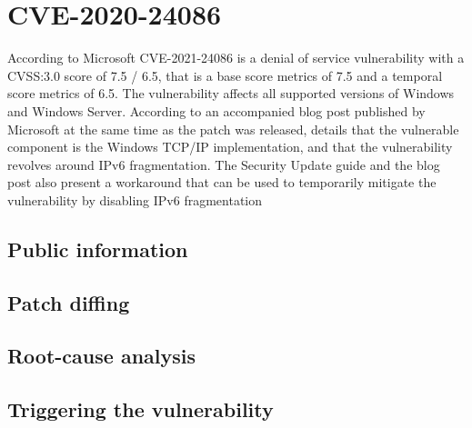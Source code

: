 \documentclass{report}
\begin{document}
\section{CVE-2020-24086}
\label{sec:CVE-2020-24086}
According to Microsoft\cite{url:microsoft:cve-2021-24086} CVE-2021-24086 is a denial of service vulnerability with a CVSS:3.0 score of 7.5 / 6.5, that is a base score metrics of 7.5 and a temporal score metrics of 6.5. The vulnerability affects all supported versions of Windows and Windows Server. According to an accompanied blog post published by Microsoft
\cite{url:microsoft:cve-2021-24086-blog} at the same time as the patch was released, details that the vulnerable component is the Windows TCP/IP implementation, and that the vulnerability revolves around IPv6 fragmentation. The Security Update guide and the blog post also present a workaround that can be used to temporarily mitigate the vulnerability by disabling IPv6 fragmentation

\subsection{Public information}
\subsection{Patch diffing}
\subsection{Root-cause analysis}
\subsection{Triggering the vulnerability}

\end{document}
